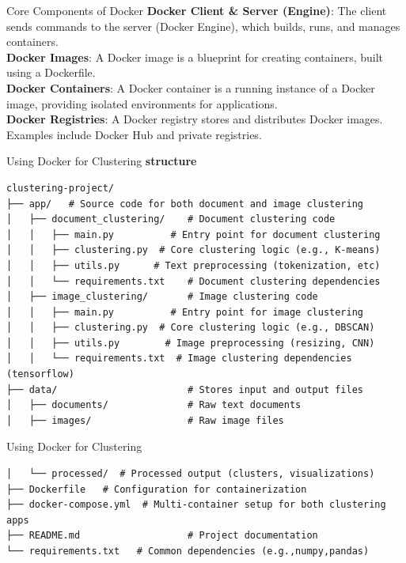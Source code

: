 \documentclass[notes]{beamer}
\begin{document}
{
\begin{frame}{Core Components of Docker}
    \textbf{Docker Client \& Server (Engine)}: The client sends commands to the server (Docker Engine), which builds, runs, and manages containers. \\
    
    \textbf{Docker Images}: A Docker image is a blueprint for creating containers, built using a Dockerfile. \\
    
    \textbf{Docker Containers}: A Docker container is a running instance of a Docker image, providing isolated environments for applications. \\
    
    \textbf{Docker Registries}: A Docker registry stores and distributes Docker images. Examples include Docker Hub and private registries. \\
\end{frame}
\begin{frame}[fragile]{Using Docker for Clustering }
\textbf{structure}

\begin{verbatim}
clustering-project/
├── app/   # Source code for both document and image clustering
│   ├── document_clustering/    # Document clustering code
│   │   ├── main.py          # Entry point for document clustering
│   │   ├── clustering.py  # Core clustering logic (e.g., K-means)
│   │   ├── utils.py      # Text preprocessing (tokenization, etc)
│   │   └── requirements.txt    # Document clustering dependencies 
│   ├── image_clustering/       # Image clustering code
│   │   ├── main.py          # Entry point for image clustering
│   │   ├── clustering.py  # Core clustering logic (e.g., DBSCAN)
│   │   ├── utils.py        # Image preprocessing (resizing, CNN)
│   │   └── requirements.txt  # Image clustering dependencies (tensorflow)
├── data/                       # Stores input and output files
│   ├── documents/              # Raw text documents
│   ├── images/                 # Raw image files

\end{verbatim}
\end{frame}

\begin{frame}[fragile]{Using Docker for Clustering }
\begin{verbatim}
│   └── processed/  # Processed output (clusters, visualizations)
├── Dockerfile   # Configuration for containerization
├── docker-compose.yml  # Multi-container setup for both clustering apps
├── README.md                   # Project documentation
└── requirements.txt   # Common dependencies (e.g.,numpy,pandas)
\end{verbatim} 



\end{frame}}
\end{document}

